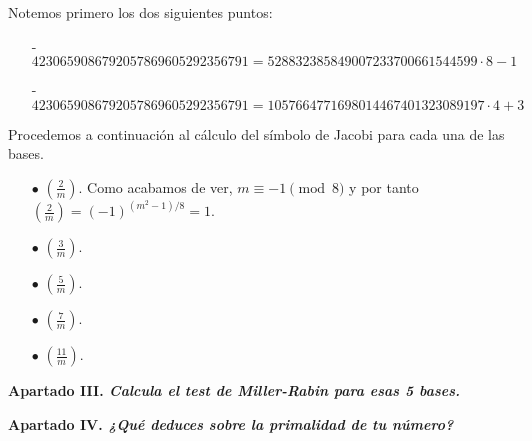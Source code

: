 \documentclass[fleqn]{article}
\begin{document}
    Notemos primero los dos siguientes puntos:
    \begin{enumerate}
        \item[-] $ 4230659086792057869605292356791 = 528832385849007233700661544599\cdot 8 - 1 $
        \item[-] $ 4230659086792057869605292356791 = 1057664771698014467401323089197\cdot 4 + 3$
    \end{enumerate}
    Procedemos a continuación al cálculo del símbolo de Jacobi para cada una de las bases.\\ 
    \begin{enumerate}
        \item[$\bullet$] $\left(\frac{2}{m}\right)$. Como acabamos de ver, $m \equiv -1 \pmod{8}$ y por tanto 
                        $\left(\frac{2}{m}\right) = (-1)^{(m^2 - 1)/8} = 1$.
        \item[$\bullet$] $\left(\frac{3}{m}\right)$.
        \item[$\bullet$] $\left(\frac{5}{m}\right)$.
        \item[$\bullet$] $\left(\frac{7}{m}\right)$.
        \item[$\bullet$] $\left(\frac{11}{m}\right)$.
    \end{enumerate}
    \newpage
    \textbf{Apartado III. \textit{Calcula el test de Miller-Rabin para esas 5 bases.}}


    \newpage
    \textbf{Apartado IV. \textit{¿Qué deduces sobre la primalidad de tu número?}}
\end{document}
